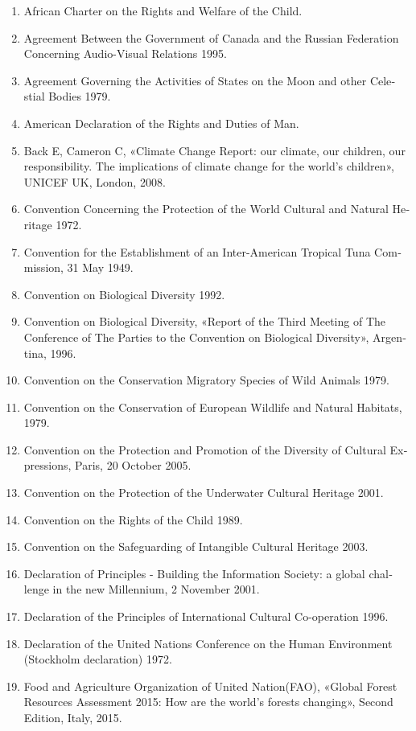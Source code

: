 {{{\begin{latin}
\begin{enumerate}
\item African Charter on the Rights and Welfare of the Child.
\item Agreement Between the Government of Canada and the Russian Federation Concerning Audio-Visual Relations 1995.
\item Agreement Governing the Activities of States on the Moon and other Celestial Bodies 1979.
\item American Declaration of the Rights and Duties of Man.
\item Back E, Cameron C, «Climate Change Report: our climate, our children, our responsibility. The implications of climate change for the world’s children», UNICEF UK, London,  2008.
\item Convention Concerning the Protection of the World Cultural and Natural Heritage 1972.
\item Convention for the Establishment of an Inter-American Tropical Tuna Commission, 31 May 1949.
\item Convention on Biological Diversity 1992.
\item Convention on Biological Diversity, «Report of the Third Meeting of The Conference of The Parties to the Convention on Biological Diversity», Argentina, 1996.
\item Convention on the Conservation Migratory Species of Wild Animals 1979.
\item Convention on the Conservation of European Wildlife and Natural Habitats, 1979.
\item Convention on the Protection and Promotion of the Diversity of Cultural Expressions, Paris, 20 October 2005.
\item Convention on the Protection of the Underwater Cultural Heritage 2001.
\item Convention on the Rights of the Child 1989.
\item Convention on the Safeguarding of Intangible Cultural Heritage 2003.
\item Declaration of   Principles - Building the Information Society: a global challenge in the new Millennium, 2 November 2001.
\item Declaration of the Principles of International Cultural Co-operation 1996.
\item Declaration of the United Nations Conference on the Human Environment (Stockholm declaration) 1972.
\item Food and Agriculture Organization of United Nation(FAO), «Global Forest Resources Assessment 2015: How are the world's forests changing»,  Second Edition, Italy, 2015.

\end{enumerate}
\end{latin}}}}
